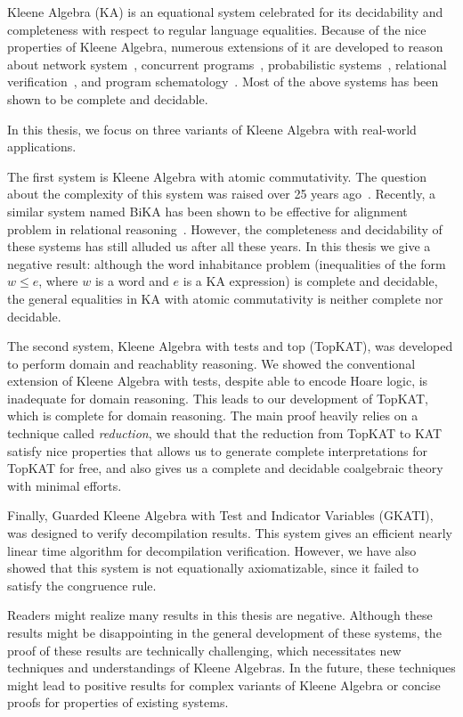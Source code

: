 
Kleene Algebra (KA) is an equational system celebrated for its decidability 
and completeness with respect to regular language equalities.
Because of the nice properties of Kleene Algebra, 
numerous extensions of it are developed to reason about
network system~\cite{Anderson_Foster_Guha_Jeannin_Kozen_Schlesinger_Walker_2014,Foster_Kozen_Milano_Silva_Thompson_2015},
concurrent programs~\cite{Hoare_Möller_Struth_Wehrman_2009,Kappé_Brunet_Silva_Wagemaker_Zanasi_2020,Kappé_Brunet_Silva_Zanasi_2018}, 
probabilistic systems~\cite{McIver_Cohen_Morgan_2006, McIver_Rabehaja_Struth_2011}, 
relational verification~\cite{Antonopoulos_Koskinen_Le_Nagasamudram_Naumann_Ngo_2022},
and program schematology~\cite{Angus_Kozen_2001}.
Most of the above systems has been shown to be complete and decidable.

In this thesis, we focus on three variants of Kleene Algebra with real-world applications.

The first system is Kleene Algebra with atomic commutativity.
The question about the complexity of this system was raised over 25 years ago~\cite{Kozen_1996}.
Recently, a similar system named BiKA has been shown to be effective for alignment problem 
in relational reasoning~\cite{Antonopoulos_Koskinen_Le_Nagasamudram_Naumann_Ngo_2022}.
However, the completeness and decidability of these systems has still alluded us
after all these years. In this thesis we give a negative result:
although the word inhabitance problem 
(inequalities of the form \(w ≤ e\), where \(w\) is a word and \(e\) is a KA expression)
is complete and decidable, the general equalities in KA with atomic commutativity is 
neither complete nor decidable.

The second system, Kleene Algebra with tests and top (TopKAT), 
was developed to perform domain and reachablity reasoning.
We showed the conventional extension of Kleene Algebra with tests, 
despite able to encode Hoare logic, is inadequate for domain reasoning.
This leads to our development of TopKAT, which is complete for domain reasoning.
The main proof heavily relies on a technique called \emph{reduction},
we should that the reduction from TopKAT to KAT satisfy nice properties that allows 
us to generate complete interpretations for TopKAT for free,
and also gives us a complete and decidable coalgebraic theory with minimal efforts.

Finally, Guarded Kleene Algebra with Test and Indicator Variables (GKATI),
was designed to verify decompilation results. 
This system gives an efficient nearly linear time algorithm for decompilation verification.
However, we have also showed that this system is not equationally axiomatizable, 
since it failed to satisfy the congruence rule.

Readers might realize many results in this thesis are negative.
Although these results might be disappointing in the general development of these systems, 
the proof of these results are technically challenging, 
which necessitates new techniques and understandings of Kleene Algebras.
In the future, these techniques might lead to positive results for 
complex variants of Kleene Algebra or concise proofs for properties of existing systems.